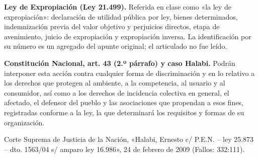 \documentclass[12pt,oneside]{book}
\begin{document}
\begin{note}
\textbf{Ley de Expropiación (Ley 21.499).} Referida en clase como «la ley de expropiación»: declaración de utilidad pública por ley, bienes determinados, indemnización previa del valor objetivo y perjuicios directos, etapa de avenimiento, juicio de expropiación y expropiación inversa. La identificación por su número es un agregado del apunte original; el articulado no fue leído.
\end{note}

\begin{note}
\textbf{Constitución Nacional, art. 43 (2.º párrafo) y caso Halabi.} Podrán interponer esta acción contra cualquier forma de discriminación y en lo relativo a los derechos que protegen al ambiente, a la competencia, al usuario y al consumidor, así como a los derechos de incidencia colectiva en general, el afectado, el defensor del pueblo y las asociaciones que propendan a esos fines, registradas conforme a la ley, la que determinará los requisitos y formas de su organización.

Corte Suprema de Justicia de la Nación, «Halabi, Ernesto c/ P.E.N. -- ley 25.873 -- dto. 1563/04 s/ amparo ley 16.986», 24 de febrero de 2009 (Fallos: 332:111).
\end{note}
\end{document}
